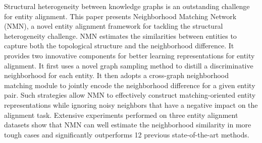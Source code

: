Structural heterogeneity between knowledge graphs is an outstanding challenge for entity alignment. This paper presents Neighborhood Matching Network (NMN), a novel entity alignment framework for tackling the structural heterogeneity challenge. NMN estimates the similarities between entities to capture both the topological structure and the neighborhood difference. It provides two innovative components for better learning representations for entity alignment. It first uses a novel graph sampling method to distill a discriminative neighborhood for each entity. It then adopts a cross-graph neighborhood matching module to jointly encode the neighborhood difference for a given entity pair. Such strategies allow NMN to effectively construct matching-oriented entity representations while ignoring noisy neighbors that have a negative impact on the alignment task. Extensive experiments performed on three entity alignment datasets show that NMN can well estimate the neighborhood similarity in more tough cases and significantly outperforms 12 previous state-of-the-art methods.
